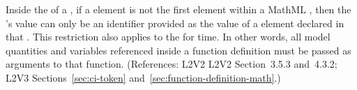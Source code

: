 Inside the  of a \FunctionDefinition, if a  element
is not the first element within a MathML , then the
's value can only be an identifier provided as the
value of a  element declared in that .
This restriction also applies to the  for time.
In other words, all model quantities and variables referenced
inside a function definition must be passed as arguments to that function.
(References: L2V2 L2V2 Section~3.5.3 and~4.3.2; L2V3
Sections~\ref{sec:ci-token} and~\ref{sec:function-definition-math}.)
